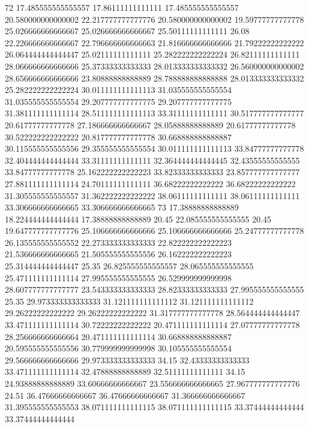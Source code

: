 72 17.485555555555557 17.86111111111111 17.485555555555557 20.580000000000002 22.217777777777776 20.580000000000002 19.59777777777778 25.026666666666667 25.026666666666667 25.50111111111111 26.08 22.226666666666667 22.796666666666663 21.816666666666666 21.79222222222222 26.064444444444447 25.02111111111111 25.282222222222224 26.82111111111111 28.066666666666666 25.37333333333333 28.013333333333332 26.560000000000002 28.656666666666666 23.80888888888889 28.788888888888888 28.013333333333332 25.282222222222224 30.011111111111113 31.035555555555554 31.035555555555554 29.207777777777775 29.207777777777775 31.381111111111114 28.511111111111113 33.31111111111111 30.517777777777777 20.61777777777778 27.186666666666667 28.05888888888889 20.61777777777778 30.522222222222222 20.817777777777778 30.668888888888887 30.115555555555556 29.355555555555554 30.011111111111113 33.84777777777778 32.404444444444444 33.31111111111111 32.364444444444445 32.43555555555555 33.84777777777778 25.162222222222223 33.82333333333333 23.857777777777777 27.881111111111114 24.70111111111111 36.68222222222222 36.68222222222222 31.305555555555557 31.362222222222222 38.06111111111111 38.06111111111111 33.306666666666665 33.306666666666665
73 17.38888888888889 18.224444444444444 17.38888888888889 20.45 22.085555555555555 20.45 19.647777777777776 25.106666666666666 25.106666666666666 25.24777777777778 26.135555555555552 22.273333333333333 22.822222222222223 21.536666666666665 21.505555555555556 26.162222222222223 25.314444444444447 25.35 26.825555555555557 28.065555555555555 25.471111111111114 27.995555555555555 26.529999999999998 28.607777777777777 23.543333333333333 28.82333333333333 27.995555555555555 25.35 29.973333333333333 31.121111111111112 31.121111111111112 29.26222222222222 29.26222222222222 31.317777777777778 28.564444444444447 33.471111111111114 30.72222222222222 20.471111111111114 27.07777777777778 28.256666666666664 20.471111111111114 30.668888888888887 20.595555555555556 30.779999999999998 30.105555555555554 29.566666666666666 29.973333333333333 34.15 32.43333333333333 33.471111111111114 32.47888888888889 32.51111111111111 34.15 24.93888888888889 33.60666666666667 23.556666666666665 27.967777777777776 24.51 36.47666666666667 36.47666666666667 31.366666666666667 31.395555555555553 38.071111111111115 38.071111111111115 33.37444444444444 33.37444444444444
